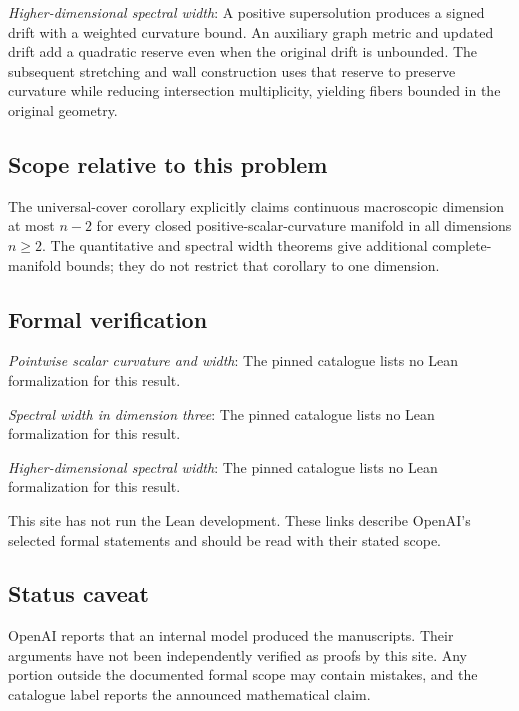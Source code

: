 \documentclass[11pt]{article}
\begin{document}
\textit{Higher-dimensional spectral width}: A positive supersolution produces a signed drift with a weighted curvature bound. An auxiliary graph metric and updated drift add a quadratic reserve even when the original drift is unbounded. The subsequent stretching and wall construction uses that reserve to preserve curvature while reducing intersection multiplicity, yielding fibers bounded in the original geometry.

\subsection{Scope relative to this problem}
The universal-cover corollary explicitly claims continuous macroscopic dimension at most $n-2$ for every closed positive-scalar-curvature manifold in all dimensions $n\ge2$. The quantitative and spectral width theorems give additional complete-manifold bounds; they do not restrict that corollary to one dimension.

\subsection{Formal verification}
\textit{Pointwise scalar curvature and width}: The pinned catalogue lists no Lean formalization for this result.

\textit{Spectral width in dimension three}: The pinned catalogue lists no Lean formalization for this result.

\textit{Higher-dimensional spectral width}: The pinned catalogue lists no Lean formalization for this result.

This site has not run the Lean development. These links describe OpenAI’s selected formal statements and should be read with their stated scope.

\subsection{Status caveat}
OpenAI reports that an internal model produced the manuscripts. Their arguments have not been independently verified as proofs by this site. Any portion outside the documented formal scope may contain mistakes, and the catalogue label reports the announced mathematical claim.
\end{document}
